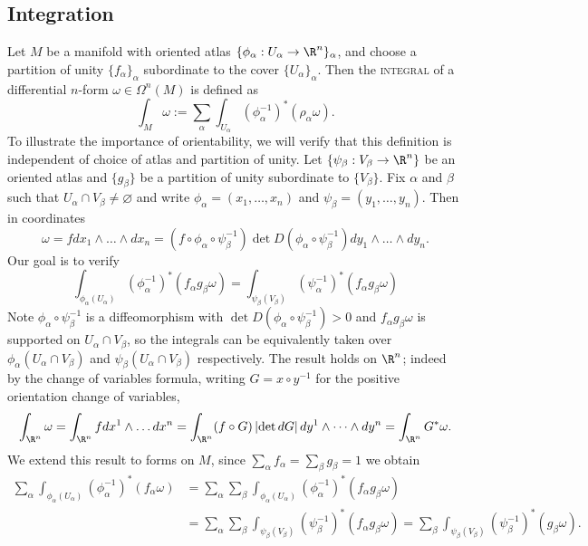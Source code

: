 \documentclass[reqno]{amsart}
\theoremstyle{definition}
\theoremstyle{remark}
\renewcommand{\emph}{\textsc}
\begin{document}
\subsection{Integration}

Let $M$ be a manifold with oriented atlas $\{\phi_\alpha : U_\alpha \to \R^n\}_\alpha$, and choose a partition of unity $\{f_\alpha\}_\alpha$ subordinate to the cover $\{U_\alpha\}_\alpha$. Then the \emph{integral} of a differential $n$-form $\omega \in \Omega^n (M)$ is defined as
	\[ \int_M \omega := \sum_\alpha \int_{U_\alpha} (\phi^{-1}_\alpha)^* (\rho_\alpha \omega). \]
To illustrate the importance of orientability, we will verify that this definition is independent of choice of atlas and partition of unity. Let $\{ \psi_\beta : V_\beta \to \R^n \}$ be an oriented atlas and $\{g_\beta\}$ be a partition of unity subordinate to $\{V_\beta\}$. Fix $\alpha$ and $\beta$ such that $U_\alpha \cap V_\beta \neq \varnothing$ and write $\phi_\alpha = (x_1, \dots, x_n)$ and $\psi_\beta = (y_1, \dots, y_n)$. Then in coordinates
		\[ \omega = f dx_1 \wedge \dots \wedge dx_n = (f \circ \phi_\alpha \circ \psi_\beta^{-1})\det D(\phi_\alpha \circ \psi_\beta^{-1}) dy_1 \wedge \dots \wedge dy_n.  \]
	 Our goal is to verify
		\[ \int_{\phi_\alpha (U_\alpha)} \left( \phi_\alpha^{-1} \right)^* (f_\alpha g_\beta \omega) = \int_{\psi_\beta (V_\beta)} \left( \psi_\alpha^{-1} \right)^* (f_\alpha g_\beta \omega)\]
	Note $\phi_\alpha \circ \psi^{-1}_\beta$ is a diffeomorphism with $\det D(\phi_\alpha \circ \psi_\beta^{-1}) > 0$ and $f_\alpha g_\beta \omega$ is supported on $U_\alpha \cap V_\beta$, so the integrals can be equivalently taken over $\phi_\alpha (U_\alpha \cap V_\beta)$ and $\psi_\beta (U_\alpha \cap V_\beta)$ respectively. The result holds on $\R^n$; indeed by the change of variables formula, writing $G = x \circ y^{-1}$ for the positive orientation change of variables, 
		\begin{align*}
			\int_{\R^n} \omega = \int_{\R^n} f dx^1 \wedge \dots dx^n = \int_{\R^n} (f \circ G) \left| \det dG \right| dy^1 \wedge \dots \wedge dy^n = \int_{\R^n} G^* \omega.
		\end{align*}
	We extend this result to forms on $M$, since $\sum_\alpha f_\alpha = \sum_\beta g_\beta = 1$ we obtain
		\begin{align*}
			\sum_\alpha \int_{\phi_\alpha (U_\alpha)} \left( \phi_\alpha^{-1} \right)^* (f_\alpha \omega)
				&= \sum_\alpha \sum_\beta \int_{\phi_\alpha (U_\alpha)} \left( \phi_\alpha^{-1} \right)^* (f_\alpha g_\beta \omega) \\
				&= \sum_\alpha \sum_\beta  \int_{\psi_\beta (V_\beta)} \left( \psi_\beta^{-1} \right)^* (f_\alpha g_\beta \omega) = \sum_\beta \int_{\psi_\beta (V_\beta)} \left( \psi_\beta^{-1} \right)^* (g_\beta \omega). 
		\end{align*}
\end{document}
